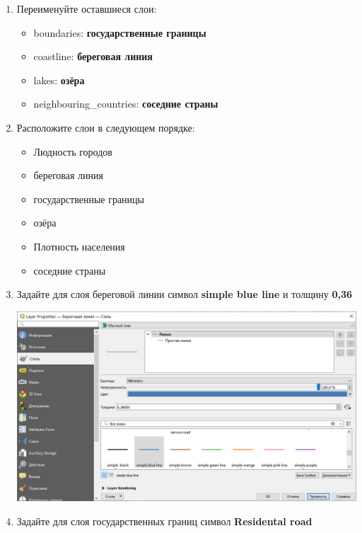 \documentclass[
  12pt,
]{book}
\providecommand{\tightlist}{%
  \setlength{\itemsep}{0pt}\setlength{\parskip}{0pt}}
\begin{document}
\begin{enumerate}
\def\labelenumi{\arabic{enumi}.}
\item
  Переименуйте оставшиеся слои:

  \begin{itemize}
  \tightlist
  \item
    boundaries: \textbf{государственные границы}
  \item
    coastline: \textbf{береговая линия}
  \item
    lakes: \textbf{озёра}
  \item
    neighbouring\_countries: \textbf{соседние страны}
  \end{itemize}
\item
  Расположите слои в следующем порядке:

  \begin{itemize}
  \tightlist
  \item
    Людность городов
  \item
    береговая линия
  \item
    государственные границы
  \item
    озёра
  \item
    Плотность населения
  \item
    соседние страны
  \end{itemize}
\item
  Задайте для слоя береговой линии символ \textbf{simple blue line} и толщину \textbf{0,36}

  \includegraphics{images/Ex03/symbol_coastline.png}
\item
  Задайте для слоя государственных границ символ \textbf{Residental road}


\end{enumerate}
\end{document}
